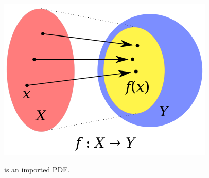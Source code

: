 \documentclass{article}
\begin{document}
\begin{center}
    \includegraphics[clip, trim = 30 30 40 50]{test.png}
\end{center}
is an imported PDF.
\end{document}
